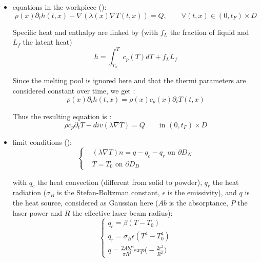 \documentclass[11pt,a4paper]{article}
\begin{document}
\begin{itemize}
	\item equations in the workpiece (\cite{LiParametricanalysisthermal2014,Robertsthreedimensionalfiniteelement2009,AllaireTakingaccountthermal2017,MegahedMetaladditivemanufacturingprocess2016}): 
	\begin{equation}
	\label{eq:eqChaleurSimple}
	\rho(x)\partial_th(t,x)-\nabla(\lambda(x)\nabla T(t,x))=Q, \qquad \forall (t,x)\in (0,t_F)\times D
	\end{equation}	
	
	Specific heat and enthalpy are linked by (with $f_L$ the fraction of liquid and $L_f$ the latent heat) 
	\begin{equation}
	h=\int_{T_0}^{T}c_p(T)dT+f_LL_f
	\end{equation}
	
	Since the melting pool is ignored here and that the thermi parameters are considered constant over time, we get :
	\begin{equation}
	\rho(x)\partial_th(t,x)=\rho(x)c_p(x)\partial_tT(t,x)
	\end{equation}
	
	Thus the resulting equation is :
	\begin{equation}
	\rho c_p\partial_tT-div(\lambda\nabla T)=Q  \qquad  \textrm{in}\,\,(0,t_F)\times D 
	\end{equation}
	
	\item limit conditions (\cite{LiParametricanalysisthermal2014,Robertsthreedimensionalfiniteelement2009,MegahedMetaladditivemanufacturingprocess2016}):
	\begin{equation}
	\label{eq:conlimitemp}
	\left\{
	\begin{aligned}
	&(\lambda\nabla T)n=q-q_c-q_r \,\, \textrm{on}\,\, \partial D_N \\
	&T=T_0 \,\, \textrm{on}\,\,\partial D_D
	\end{aligned}
	\right.
	\end{equation}
	 
	with $q_c$ the heat convection (different from solid to powder), $q_r$ the heat radiation ($\sigma_B$ is the Stefan-Boltzman constant, $\epsilon$ is the emissivity), and $q$ is the heat source, considered as Gaussian here ($Ab$ is the absorptance, $P$ the laser power and $R$ the effective laser beam radius): 
	\begin{equation}
	\left\{
	\begin{array}{l}
	q_c=\beta (T-T_0)  \\
	q_r=\sigma_B\epsilon(T^4-T_0^4)	 \\
	q=\frac{2AbP}{\pi R^2}exp\Big(-\frac{2r^2}{R^2}\Big)
	\end{array}
	\right.
	\end{equation}
	

\end{itemize}
\end{document}
